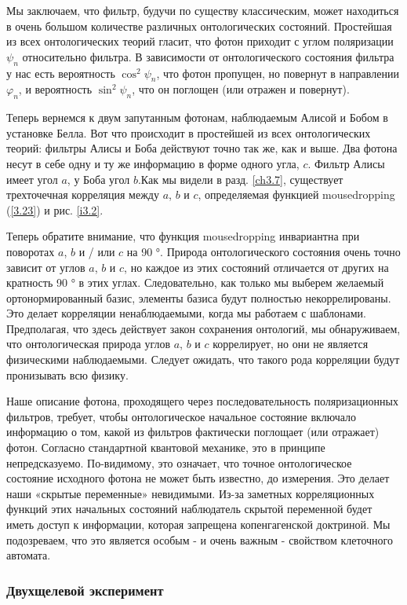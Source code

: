 \documentclass[main.tex]{subfiles}
\begin{document}
Мы заключаем, что фильтр, будучи по существу классическим, может находиться в очень большом количестве различных онтологических состояний. Простейшая из всех онтологических теорий гласит, что фотон приходит с углом поляризации $\psi_n$ относительно фильтра. В зависимости от онтологического состояния фильтра у нас есть вероятность $\cos^2 \psi_n$, что фотон пропущен, но повернут в направлении $\varphi_n$, и вероятность $\sin^2 \psi_n$, что он поглощен (или отражен и повернут).

Теперь вернемся к двум запутанным фотонам, наблюдаемым Алисой и Бобом в установке Белла. Вот что происходит в простейшей из всех онтологических теорий: фильтры Алисы и Боба действуют точно так же, как и выше. Два фотона несут в себе одну и ту же информацию в форме одного угла, $c$. Фильтр Алисы имеет угол $a$, у Боба угол $b$.Как мы видели в разд. \ref{ch3.7}, существует трехточечная корреляция между $a$, $b$ и $c$, определяемая функцией mousedropping (\ref{3.23}) и рис. \ref{i3.2}.

Теперь обратите внимание, что функция mousedropping инвариантна при поворотах $a$, $b$ и / или $c$ на 90 °. Природа онтологического состояния очень точно зависит от углов $a$, $b$ и $c$, но каждое из этих состояний отличается от других на кратность 90 ° в этих углах. Следовательно, как только мы выберем желаемый ортонормированный базис, элементы базиса будут полностью некоррелированы. Это делает корреляции ненаблюдаемыми, когда мы работаем с шаблонами. Предполагая, что здесь действует закон сохранения онтологий, мы обнаруживаем, что онтологическая природа углов $a$, $b$ и $c$ коррелирует, но они не является физическими наблюдаемыми. Следует ожидать, что такого рода корреляции будут пронизывать всю физику.

Наше описание фотона, проходящего через последовательность поляризационных фильтров, требует, чтобы онтологическое начальное состояние включало информацию о том, какой из фильтров фактически поглощает (или отражает) фотон. Согласно стандартной квантовой механике, это в принципе непредсказуемо. По-видимому, это означает, что точное онтологическое состояние исходного фотона не может быть известно, до измерения. Это делает наши «скрытые переменные» невидимыми. Из-за заметных корреляционных функций этих начальных состояний наблюдатель скрытой переменной будет иметь доступ к информации, которая запрещена копенгагенской доктриной. Мы подозреваем, что это является особым - и очень важным - свойством клеточного автомата.


\subsubsection{Двухщелевой эксперимент}\label{ch5.7.9}
\end{document}
